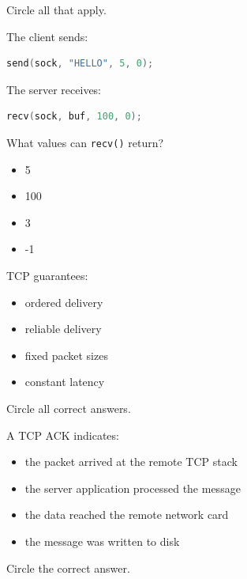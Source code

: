 \begin{questions}
	Circle all that apply.

	\question[10]

	The client sends:

	\begin{lstlisting}[language=C]
send(sock, "HELLO", 5, 0);
\end{lstlisting}

	The server receives:

	\begin{lstlisting}[language=C]
recv(sock, buf, 100, 0);
\end{lstlisting}

	What values can \texttt{recv()} return?

	\begin{itemize}
		\item 5
		\item 100
		\item 3
		\item -1
	\end{itemize}

	\question[8]

	TCP guarantees:

	\begin{itemize}
		\item ordered delivery
		\item reliable delivery
		\item fixed packet sizes
		\item constant latency
	\end{itemize}

	Circle all correct answers.

	\question[10]

	A TCP ACK indicates:

	\begin{itemize}
		\item the packet arrived at the remote TCP stack
		\item the server application processed the message
		\item the data reached the remote network card
		\item the message was written to disk
	\end{itemize}

	Circle the correct answer.

	\question[8]


\end{questions}
